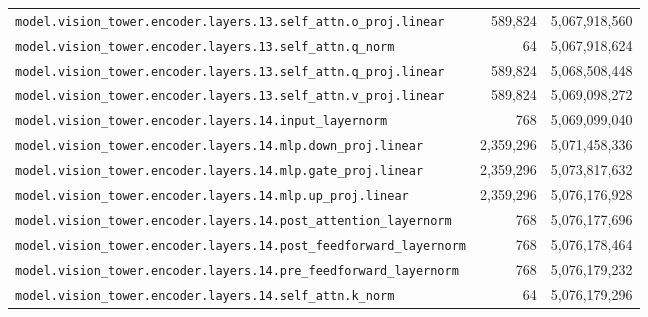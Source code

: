 \documentclass[10pt,a4paper]{article}
\theoremstyle{definition}
\begin{document}
\begin{appendices}
\begin{longtable}{p{9.5cm}rr}
\texttt{model.\allowbreak{}vision\_tower.\allowbreak{}encoder.\allowbreak{}layers.\allowbreak{}13.\allowbreak{}self\_attn.\allowbreak{}o\_proj.\allowbreak{}linear} & 589,824 & 5,067,918,560 \\
\texttt{model.\allowbreak{}vision\_tower.\allowbreak{}encoder.\allowbreak{}layers.\allowbreak{}13.\allowbreak{}self\_attn.\allowbreak{}q\_norm} & 64 & 5,067,918,624 \\
\texttt{model.\allowbreak{}vision\_tower.\allowbreak{}encoder.\allowbreak{}layers.\allowbreak{}13.\allowbreak{}self\_attn.\allowbreak{}q\_proj.\allowbreak{}linear} & 589,824 & 5,068,508,448 \\
\texttt{model.\allowbreak{}vision\_tower.\allowbreak{}encoder.\allowbreak{}layers.\allowbreak{}13.\allowbreak{}self\_attn.\allowbreak{}v\_proj.\allowbreak{}linear} & 589,824 & 5,069,098,272 \\
\texttt{model.\allowbreak{}vision\_tower.\allowbreak{}encoder.\allowbreak{}layers.\allowbreak{}14.\allowbreak{}input\_layernorm} & 768 & 5,069,099,040 \\
\texttt{model.\allowbreak{}vision\_tower.\allowbreak{}encoder.\allowbreak{}layers.\allowbreak{}14.\allowbreak{}mlp.\allowbreak{}down\_proj.\allowbreak{}linear} & 2,359,296 & 5,071,458,336 \\
\texttt{model.\allowbreak{}vision\_tower.\allowbreak{}encoder.\allowbreak{}layers.\allowbreak{}14.\allowbreak{}mlp.\allowbreak{}gate\_proj.\allowbreak{}linear} & 2,359,296 & 5,073,817,632 \\
\texttt{model.\allowbreak{}vision\_tower.\allowbreak{}encoder.\allowbreak{}layers.\allowbreak{}14.\allowbreak{}mlp.\allowbreak{}up\_proj.\allowbreak{}linear} & 2,359,296 & 5,076,176,928 \\
\texttt{model.\allowbreak{}vision\_tower.\allowbreak{}encoder.\allowbreak{}layers.\allowbreak{}14.\allowbreak{}post\_attention\_layernorm} & 768 & 5,076,177,696 \\
\texttt{model.\allowbreak{}vision\_tower.\allowbreak{}encoder.\allowbreak{}layers.\allowbreak{}14.\allowbreak{}post\_feedforward\_layernorm} & 768 & 5,076,178,464 \\
\texttt{model.\allowbreak{}vision\_tower.\allowbreak{}encoder.\allowbreak{}layers.\allowbreak{}14.\allowbreak{}pre\_feedforward\_layernorm} & 768 & 5,076,179,232 \\
\texttt{model.\allowbreak{}vision\_tower.\allowbreak{}encoder.\allowbreak{}layers.\allowbreak{}14.\allowbreak{}self\_attn.\allowbreak{}k\_norm} & 64 & 5,076,179,296 \\

\end{longtable}
\end{appendices}
\end{document}
